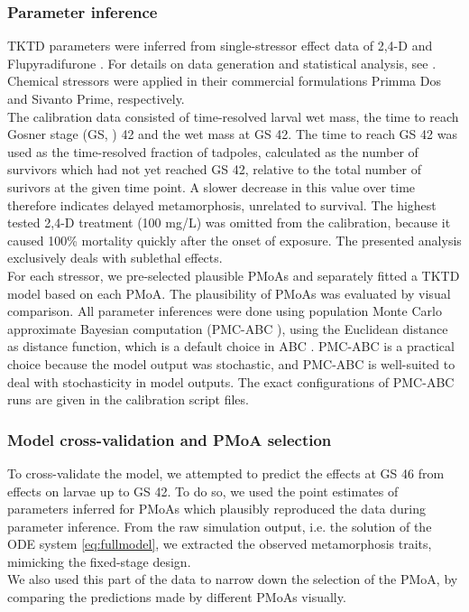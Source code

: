 \documentclass[utf8]{FrontiersinHarvard} %
\begin{document}
\subsubsection{Parameter inference}
%
TKTD parameters were inferred from single-stressor effect data of 2,4-D and Flupyradifurone \citep{gonzalez-lopezChronicExposurePesticides2026}.
For details on data generation and statistical analysis, see \citet{gonzalez-lopezChronicExposurePesticides2026}. 
Chemical stressors were applied in their commercial formulations Primma \textregistered Dos and Sivanto \textregistered Prime, respectively.  \\ 
The calibration data consisted of time-resolved larval wet mass, 
the time to reach Gosner stage (GS, \citet{gosnerSimplifiedTableStaging1960}) 42 and the wet mass at GS 42. 
The time to reach GS 42 was used as the time-resolved fraction 
of tadpoles, calculated as the number of survivors which had not yet reached GS 42, 
relative to the total number of surivors at the given time point.
A slower decrease in this value over time therefore indicates delayed metamorphosis, 
unrelated to survival.  
The highest tested 2,4-D treatment (100 mg/L) was omitted from the calibration, 
because it caused 100\% mortality quickly after the onset of exposure. 
The presented analysis exclusively deals with sublethal effects.\\
% 
For each stressor, we pre-selected plausible PMoAs and separately fitted a TKTD model based on each PMoA. 
The plausibility of PMoAs was evaluated by visual comparison.
%
All parameter inferences were done using population Monte Carlo approximate Bayesian computation 
(PMC-ABC \citep{beaumontAdaptiveApproximateBayesian2009}), 
using the Euclidean distance as distance function, which is a default choice in ABC \citep{prangleAdaptingABCDistance2017}. 
PMC-ABC is a practical choice because the model output was stochastic, 
and PMC-ABC is well-suited to deal with stochasticity in model outputs. 
The exact configurations of PMC-ABC runs are given in the calibration script files.\\
%
\subsubsection{Model cross-validation and PMoA selection}
%
To cross-validate the model, we attempted to predict the effects at GS 46 from effects on larvae up to GS 42. 
To do so, we used the point estimates of parameters inferred for PMoAs which plausibly reproduced the data during parameter inference. 
From the raw simulation output, i.e. the solution of the ODE system \ref{eq:fullmodel}, 
we extracted the observed metamorphosis traits, mimicking the fixed-stage design. \\ 
We also used this part of the data to narrow down the selection of the PMoA, 
by comparing the predictions made by different PMoAs visually. 
\end{document}
